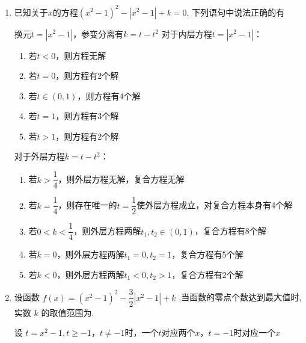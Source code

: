 \begin{enumerate}
    \item 已知关于$x$的方程$(x^2-1)^2-|x^2-1|+k = 0$. 下列语句中说法正确的有
    \begin{jieda}
        换元$t = |x^2-1|$，参变分离有$k = t - t^2$
        对于内层方程$t = |x^2-1|$：
        \begin{enumerate}
            \item 若$t < 0$，则方程无解
            \item 若$t = 0$，则方程有2个解
            \item 若$t \in (0, 1)$，则方程有4个解
            \item 若$t = 1$，则方程有3个解
            \item 若$t > 1$，则方程有2个解
        \end{enumerate}
        对于外层方程$k = t - t^2$：
        \begin{enumerate}
            \item 若$k > \dfrac{1}{4}$，则外层方程无解，复合方程无解
            \item 若$k = \dfrac{1}{4}$，则存在唯一的$t = \dfrac{1}{2}$使外层方程成立，对复合方程本身有4个解
            \item 若$0 < k < \dfrac{1}{4}$，则外层方程两解$t_1, t_2 \in (0, 1)$，复合方程有8个解
            \item 若$k = 0$，则外层方程两解$t_1 = 0, t_2 = 1$，复合方程有5个解
            \item 若$k < 0$，则外层方程两解$t_1 < 0, t_2 > 1$，复合方程有2个解
        \end{enumerate}
    \end{jieda}

    
    \item 设函数 $f\left( x\right)  = {\left( {x}^{2} - 1\right) }^{2} - \dfrac{3}{2}\left| {{x}^{2} - 1}\right|  + k$ ,当函数的零点个数达到最大值时,实数 $k$ 的取值范围为.
    \begin{jieda}
        设 $t = {x}^{2} - 1,t \geq   - 1$，$t \neq -1$时，一个$t$对应两个$x$，$t = -1$时对应一个$x$
        

\end{jieda}
\end{enumerate}
